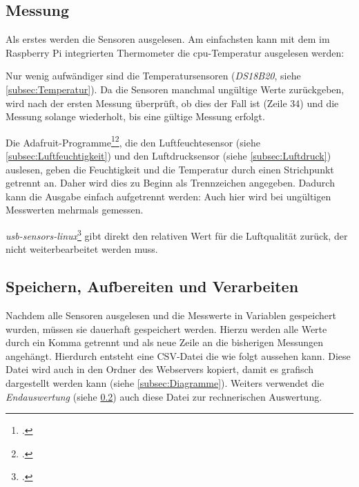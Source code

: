
\subsection{Messung}
\label{subsec:main.sh/messung}

Als erstes werden die Sensoren ausgelesen. Am einfachsten kann mit dem im Raspberry Pi integrierten Thermometer die \acrshort{cpu}-Temperatur ausgelesen werden:

Nur wenig aufwändiger sind die Temperatursensoren (\emph{DS18B20}, siehe \ref{subsec:Temperatur}). Da die Sensoren manchmal ungültige Werte zurückgeben, wird nach der ersten Messung überprüft, ob dies der Fall ist (Zeile 34) und die Messung solange wiederholt, bis eine gültige Messung erfolgt.

Die Adafruit-Programme\footcite{DHT}\footcite{bmp058_adafruit}, die den Luftfeuchtesensor (siehe \ref{subsec:Luftfeuchtigkeit}) und den Luftdrucksensor (siehe \ref{subsec:Luftdruck}) auslesen, geben die Feuchtigkeit und die Temperatur durch einen Strichpunkt getrennt an. Daher wird dies zu Beginn als Trennzeichen angegeben. 
Dadurch kann die Ausgabe einfach aufgetrennt werden:
Auch hier wird bei ungültigen Messwerten mehrmals gemessen.

\emph{usb-sensors-linux}\footcite{usb-sensors-linux} gibt direkt den relativen Wert für die Luftqualität zurück, der nicht weiterbearbeitet werden muss.

\subsection{Speichern, Aufbereiten und Verarbeiten}

Nachdem alle Sensoren ausgelesen und die Messwerte in Variablen gespeichert wurden, müssen sie dauerhaft gespeichert werden. Hierzu werden alle Werte durch ein Komma getrennt und  als neue Zeile an die bisherigen Messungen angehängt.
Hierdurch entsteht eine \gls{CSV}-Datei die wie folgt aussehen kann.
Diese Datei wird auch in den Ordner des Webservers kopiert, damit es grafisch dargestellt werden kann (siehe \ref{subsec:Diagramme}). Weiters verwendet die \textit{Endauswertung} (siehe \ref{}) auch diese Datei zur rechnerischen Auswertung.


